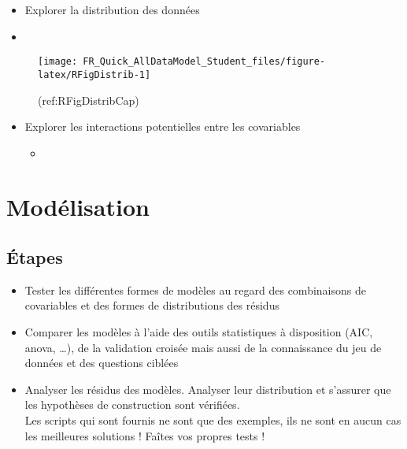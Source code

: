 \documentclass[french,a4paper]{article}
\providecommand{\tightlist}{%
  \setlength{\itemsep}{0pt}\setlength{\parskip}{0pt}}
\begin{document}
\begin{itemize}
\tightlist
\item
  Explorer la distribution des données
\item
\end{itemize}

\begin{figure}[!h]

{\centering \texttt{[image: FR\_Quick\_AllDataModel\_Student\_files/figure-latex/RFigDistrib-1]} 

}

\caption{(ref:RFigDistribCap)}\label{fig:RFigDistrib}
\end{figure}

\begin{itemize}
\tightlist
\item
  Explorer les interactions potentielles entre les covariables

  \begin{itemize}
  \tightlist
  \item
  \end{itemize}
\end{itemize}

\section{Modélisation}\label{modelisation}

\subsection{Étapes}\label{etapes-1}


\begin{itemize}
\tightlist
\item
  Tester les différentes formes de modèles au regard des combinaisons de
  covariables et des formes de distributions des résidus
\item
  Comparer les modèles à l'aide des outils statistiques à disposition
  (AIC, anova, \ldots{}), de la validation croisée mais aussi de la
  connaissance du jeu de données et des questions ciblées
\item
  Analyser les résidus des modèles. Analyser leur distribution et
  s'assurer que les hypothèses de construction sont vérifiées.\\
  \nopandoc{\begin{redbox}} Les scripts qui sont fournis ne sont que des
  exemples, ils ne sont en aucun cas les meilleures solutions ! Faîtes
  vos propres tests ! \nopandoc{\end{redbox}}
\end{itemize}
\end{document}

